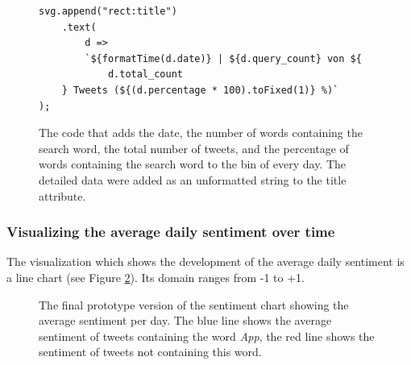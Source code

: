\begin{figure}[h!]
    \begin{verbatim}
svg.append("rect:title")
    .text(
        d =>
        `${formatTime(d.date)} | ${d.query_count} von ${
            d.total_count
    } Tweets (${(d.percentage * 100).toFixed(1)} %)`
);
    \end{verbatim}
    \caption{The code that adds the date, the number of words containing the search word, the total number of tweets, and the percentage of words containing the search word to the bin of every day. The detailed data were added as an unformatted string to the title attribute.}
    \label{code:details_title}
\end{figure}

\subsubsection{Visualizing the average daily sentiment over time}
The visualization which shows the development of the average daily sentiment is a line chart (see Figure \ref{fig:sentiment_linechart}). Its domain ranges from -1 to +1.

\begin{figure}[htb!]
    \caption{The final prototype version of the sentiment chart showing the average sentiment per day. The blue line shows the average sentiment of tweets containing the word \emph{App}, the red line shows the sentiment of tweets not containing this word.}
    \label{fig:sentiment_linechart}
\end{figure}

